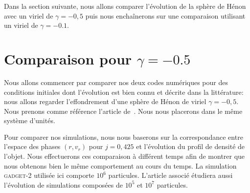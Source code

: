 
		Dans la section suivante, nous allons comparer l'évolution de la sphère de Hénon avec un viriel de $\gamma=-0,5$ puis nous
		enchaînerons sur une comparaison utilisant un viriel de $\gamma=-0.1$.

	\section{Comparaison pour $\gamma = -0.5$}

		Nous allons commencer par comparer nos deux codes numériques pour des conditions initiales dont l'évolution est bien connu et décrite
		dans la littérature: nous allons regarder l'effondrement d'une sphère de Hénon de viriel $\gamma=-0,5$. Nous prenons comme référence
		l'article de~\cite{1983PASJ...35..547F}. Nous nous placerons dans le même système d'unités.

		Pour comparer nos simulations, nous nous baserons sur la correspondance entre l'espace des phases $(r, v_r)$ pour $j=0,425$ et
		l'évolution du profil de densité de l'objet. Nous effectuerons ces comparaison à différent temps afin de montrer que nous obtenons
		bien le même comportement au cours du temps. La simulation \textsc{gadget-2} utilisée ici comporte $10^6$ particules. L'article
		associé étudiera aussi l'évolution de simulations composées de $10^5$ et $10^7$ particules.

